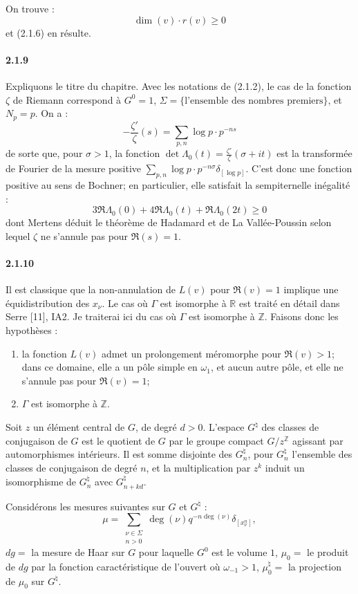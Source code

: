 \documentclass[12pt,a4paper]{article}
\theoremstyle{plain}
\theoremstyle{definition}
\theoremstyle{remark}
\newcommand{\RR}{{\mathbb{R}}}
\newcommand{\ZZ}{{\mathbb{Z}}}
\begin{document}
On trouve :
\[ \dim(v) \cdot r(v) \geq 0 \]
et (2.1.6) en r\'esulte.


\paragraph{2.1.9}
Expliquons le titre du chapitre. Avec les notations de (2.1.2), le cas de la fonction $\zeta$ de Riemann correspond \`a $G^0 = 1$, $\Sigma = \{\text{l'ensemble des nombres premiers}\}$, et $N_p = p$. On a :
\[ -\frac{\zeta'}{\zeta}(s) = \sum_{p,n} \log p \cdot p^{-ns} \]
de sorte que, pour $\sigma > 1$, la fonction $\det \Lambda_0(t) = \frac{\zeta'}{\zeta}(\sigma + it)$ est la transform\'ee de Fourier de la mesure positive $\sum_{p,n} \log p \cdot p^{-n\sigma} \delta_{[\log p]}$. C'est donc une fonction positive au sens de Bochner; en particulier, elle satisfait la sempiternelle in\'egalit\'e :
\[ 3\Re \Lambda_0(0) + 4\Re \Lambda_0(t) + \Re \Lambda_0(2t) \geq 0 \]
dont Mertens d\'eduit le th\'eor\`eme de Hadamard et de La Vall\'ee-Poussin selon lequel $\zeta$ ne s'annule pas pour $\Re(s) = 1$.


\paragraph{2.1.10}
Il est classique que la non-annulation de $L(v)$ pour $\Re(v) = 1$ implique une \'equidistribution des $x_\nu$. Le cas o\`u $\Gamma$ est isomorphe \`a $\RR$ est trait\'e en d\'etail dans Serre [11], IA2. Je traiterai ici du cas o\`u $\Gamma$ est isomorphe \`a $\ZZ$. Faisons donc les hypoth\`eses :
\begin{enumerate}[label=(\Alph*)]
\item[(C)] la fonction $L(v)$ admet un prolongement m\'eromorphe pour $\Re(v) > 1$; dans ce domaine, elle a un p\^ole simple en $\omega_1$, et aucun autre p\^ole, et elle ne s'annule pas pour $\Re(v) = 1$;
\item[(D)] $\Gamma$ est isomorphe \`a $\ZZ$.
\end{enumerate}

Soit $z$ un \'el\'ement central de $G$, de degr\'e $d > 0$. L'espace $G^\natural$ des classes de conjugaison de $G$ est le quotient de $G$ par le groupe compact $G/z^\ZZ$ agissant par automorphismes int\'erieurs. Il est somme disjointe des $G_n^\natural$, pour $G_n^\natural$ l'ensemble des classes de conjugaison de degr\'e $n$, et la multiplication par $z^k$ induit un isomorphisme de $G_n^\natural$ avec $G_{n+kd}^\natural$.

Consid\'erons les mesures suivantes sur $G$ et $G^\natural$ :
\[ \mu = \sum_{\substack{\nu \in \Sigma \\ n > 0}} \deg(\nu) q^{-n \deg(\nu)} \delta_{[x_\nu^n]}, \]
$dg =$ la mesure de Haar sur $G$ pour laquelle $G^0$ est le volume $1$,
$\mu_0 =$ le produit de $dg$ par la fonction caract\'eristique de l'ouvert o\`u $\omega_{-1} > 1$,
$\mu_0^\natural =$ la projection de $\mu_0$ sur $G^\natural$.
\end{document}
